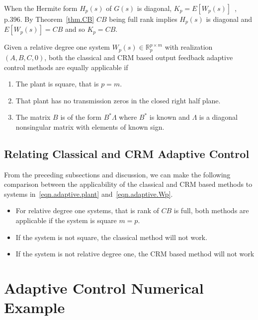 \begin{proof-dan}
  When the Hermite form $H_{p}(s)$ of $G(s)$ is diagonal, $K_{p}=E[W_{p}(s)]$~\cite{narendra.stable.2005}, p.396.
  By Theorem~\ref{thm.CB} $CB$ being full rank implies $H_{p}(s)$ is diagonal and $E[W_{p}(s)]=CB$ and so $K_{p}=CB$.
\end{proof-dan}

\begin{thm-dan}
  Given a relative degree one system $W_{p}(s)\in\mathbb{R}_{p}^{p\times m}$ with realization $(A,B,C,0)$, both the classical and CRM based output feedback adaptive control methods are equally applicable if
  \begin{enumerate}
    \item{The plant is square, that is $p=m$.}
    \item{That plant has no transmission zeros in the closed right half plane.}
    \item{The matrix $B$ is of the form $B^{*}\Lambda$ where $B^{*}$ is known and $\Lambda$ is a diagonal nonsingular matrix with elements of known sign.}
  \end{enumerate}
\end{thm-dan}

\subsection{Relating Classical and CRM Adaptive Control}

From the preceding subsections and discussion, we can make the following comparison between the applicability of the classical and CRM based methods to systems in~\eqref{eqn.adaptive.plant} and~\eqref{eqn.adaptive.Wp}.

\begin{itemize}
  \item{For relative degree one systems, that is rank of $CB$ is full, both methods are applicable if the system is square $m=p$.}
  \item{If the system is not square, the classical method will not work.}
  \item{If the system is not relative degree one, the CRM based method will not work}
\end{itemize}

\section{Adaptive Control Numerical Example}


